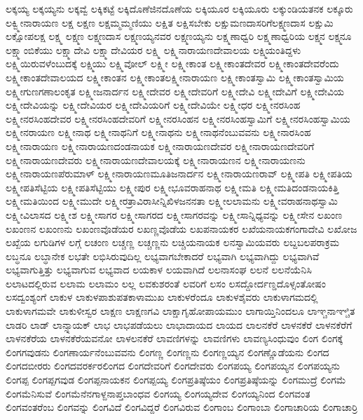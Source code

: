 {ಲಕ್ಕಯ್ಯ
ಲಕ್ಕಯ್ಯನು
ಲಕ್ಕವ್ವೆ
ಲಕ್ಕಿಕಟ್ಟೆ
ಲಕ್ಕಿದೊಣೆಜಿನದೊಣೆಯ
ಲಕ್ಕಿಯೂರ
ಲಕ್ಕಿಯೂರು
ಲಕ್ಕುಂಡಿಯತನಕ
ಲಕ್ಕೂರು
ಲಕ್ವ್ಮೀನಾರಾಯಣ
ಲಕ್ಷ
ಲಕ್ಷಣ
ಲಕ್ಷಮ್ಮಮ್ಮಣಿಯು
ಲಕ್ಷಿತ
ಲಕ್ಷಿಸಬೇಕು
ಲಕ್ಷುಮಣದಾಸರಿಗೆಲಕ್ಷ್ಮಣದಾಸ
ಲಕ್ಷುಮಿ
ಲಕ್ಷೋಪಲಕ್ಷ
ಲಕ್ಷ್ಮ
ಲಕ್ಷ್ಮಣ
ಲಕ್ಷ್ಮಣದಾಸ
ಲಕ್ಷ್ಮಣಯ್ಯನವರ
ಲಕ್ಷ್ಮಣಯ್ಯನು
ಲಕ್ಷ್ಮಣಾಧ್ವರಿ
ಲಕ್ಷ್ಮಣಾಧ್ವರಿಯ
ಲಕ್ಷ್ಮನ
ಲಕ್ಷ್ಮನೂ
ಲಕ್ಷ್ಮಾಂಬಿಕೆಯು
ಲಕ್ಷ್ಮಾದೇವಿ
ಲಕ್ಷ್ಮಾದೇವಿಯರ
ಲಕ್ಷ್ಮಿ
ಲಕ್ಷ್ಮಿನಾರಾಯಣದೇವಾಲಯ
ಲಕ್ಷ್ಮಿಯಂತಿದ್ದಳು
ಲಕ್ಷ್ಮಿಯಿರುವಳೆಂಬುದಕ್ಕೆ
ಲಕ್ಷ್ಮಿಯು
ಲಕ್ಷ್ಮಿವೋಲ್
ಲಕ್ಷ್ಮೀ
ಲಕ್ಷ್ಮೀಕಾಂತ
ಲಕ್ಷ್ಮೀಕಾಂತದೇವರ
ಲಕ್ಷ್ಮೀಕಾಂತದೇವರೆಂದು
ಲಕ್ಷ್ಮೀಕಾಂತದೇವಾಲಯದ
ಲಕ್ಷ್ಮೀಕಾಂತನ
ಲಕ್ಷ್ಮೀಕಾಂತಲಕ್ಷ್ಮೀನಾರಾಯಣ
ಲಕ್ಷ್ಮೀಕಾಂತಸ್ವಾಮಿ
ಲಕ್ಷ್ಮೀಕಾಂತಸ್ವಾಮಿಯ
ಲಕ್ಷ್ಮೀಗುಣಗಣಾಲಂಕೃತ
ಲಕ್ಷ್ಮೀಜನಾರ್ದನ
ಲಕ್ಷ್ಮೀದೇವರ
ಲಕ್ಷ್ಮೀದೇವರಿಗೆ
ಲಕ್ಷ್ಮೀದೇವಿ
ಲಕ್ಷ್ಮೀದೇವಿಗೆ
ಲಕ್ಷ್ಮೀದೇವಿಯ
ಲಕ್ಷ್ಮೀದೇವಿಯನ್ನು
ಲಕ್ಷ್ಮೀದೇವಿಯರ
ಲಕ್ಷ್ಮೀದೇವಿಯರಿಗೆ
ಲಕ್ಷ್ಮೀದೇವಿಯೇ
ಲಕ್ಷ್ಮೀಧರ
ಲಕ್ಷ್ಮೀನರಸಿಂಹ
ಲಕ್ಷ್ಮೀನರಸಿಂಹದೇವರ
ಲಕ್ಷ್ಮೀನರಸಿಂಹದೇವರಿಗೆ
ಲಕ್ಷ್ಮೀನರಸಿಂಹನ
ಲಕ್ಷ್ಮೀನರಸಿಂಹಸ್ವಾಮಿಗೆ
ಲಕ್ಷ್ಮೀನರಸಿಂಹಸ್ವಾಮಿಯ
ಲಕ್ಷ್ಮೀನರಾಯಣ
ಲಕ್ಷ್ಮೀನಾಥ
ಲಕ್ಷ್ಮೀನಾಥನಿಗೆ
ಲಕ್ಷ್ಮೀನಾಥನು
ಲಕ್ಷ್ಮೀನಾಥನೆಂಬುವವನು
ಲಕ್ಷ್ಮೀನಾರಸಿಂಹ
ಲಕ್ಷ್ಮೀನಾರಾಯಣ
ಲಕ್ಷ್ಮೀನಾರಾಯಣದಂಡನಾಯಕ
ಲಕ್ಷ್ಮೀನಾರಾಯಣದೇವರ
ಲಕ್ಷ್ಮೀನಾರಾಯಣದೇವರಿಗೆ
ಲಕ್ಷ್ಮೀನಾರಾಯಣದೇವರು
ಲಕ್ಷ್ಮೀನಾರಾಯಣದೇವಾಲಯಕ್ಕೆ
ಲಕ್ಷ್ಮೀನಾರಾಯಣನ
ಲಕ್ಷ್ಮೀನಾರಾಯಣನು
ಲಕ್ಷ್ಮೀನಾರಾಯಣಪೆರುಮಾಳ್
ಲಕ್ಷ್ಮೀನಾರಾಯಣಮೂತಿಜನಾರ್ದನ
ಲಕ್ಷ್ಮೀನಾರಾಯಣರಾವ್
ಲಕ್ಷ್ಮೀಪತಿ
ಲಕ್ಷ್ಮೀಪತಿಯ
ಲಕ್ಷ್ಮೀಪತಿಸೆಟ್ಟಿಯ
ಲಕ್ಷ್ಮೀಪತಿಸೆಟ್ಟಿಯು
ಲಕ್ಷ್ಮೀಪುರ
ಲಕ್ಷ್ಮೀಭೂವರಾಹನಾಥ
ಲಕ್ಷ್ಮೀಮತಿ
ಲಕ್ಷ್ಮೀಮತಿದಂಡನಾಯಕಿತ್ತಿ
ಲಕ್ಷ್ಮೀಮತಿಯಿಂದ
ಲಕ್ಷ್ಮೀಮುದೇ
ಲಕ್ಷ್ಮೀರತ್ರಾವಿರಾಸೀನ್ನಿಖಿಳಜನನತಾ
ಲಕ್ಷ್ಮೀಲಲಾಮನು
ಲಕ್ಷ್ಮೀವರಾಹನಾಥಸ್ವಾಮಿ
ಲಕ್ಷ್ಮೀವಿಲಾಸದ
ಲಕ್ಷ್ಮೀಶ
ಲಕ್ಷ್ಮೀಸಾಗರ
ಲಕ್ಷ್ಮೀಸಾಗರದ
ಲಕ್ಷ್ಮೀಸಾಗರವನ್ನು
ಲಕ್ಷ್ಮೀಸಾನ್ನಿಧ್ಯವನ್ನು
ಲಕ್ಷ್ಮೀಸೇನ
ಲಖಂಣ
ಲಖಂಣನ
ಲಖಂಣನು
ಲಖಂಣವೊಡೆಯರ
ಲಖಣ್ಣವೊಡೆಯ
ಲಖಪನಾಯಕರ
ಲಖೆಯನಾಯಕಗಂಗಾದೇವಿ
ಲಖೋಜ
ಲಖ್ಖೆಯ
ಲಗುಡಿಗಳ
ಲಗ್ಗೆ
ಲಚಂಣ
ಲಚ್ಚಣ್ಣ
ಲಚ್ಚಣ್ಣನು
ಲಚ್ಚಿಯನಾಯಕ
ಲನಸ್ವಾಮಿಯವರು
ಲಬ್ದಬಲಪರಾಕ್ರಮ
ಲಬ್ಧನೂ
ಲಬ್ಧಾನೇಕ
ಲಭತೇ
ಲಭಿಸಿರುವುದಿಲ್ಲ
ಲಭ್ಯವಾಗಬೇಕಾದರೆ
ಲಭ್ಯವಾಗಿ
ಲಭ್ಯವಾಗಿದ್ದು
ಲಭ್ಯವಾಗಿವೆ
ಲಭ್ಯವಾಗುತ್ತಿತ್ತು
ಲಭ್ಯವಾಗುವ
ಲಭ್ಯವಾದ
ಲಯಕಾಳ
ಲಯವಾಗಿದೆ
ಲಲನಾಸಂಘ
ಲಲನೆ
ಲಲನೆಯೆನಿಸಿ
ಲಲಾಟದಲ್ಲಿರುವ
ಲಲಾಮ
ಲಲಾಮಂ
ಲಲ್ಲ
ಲವಕುಶರಂತೆ
ಲವರಿಗೆ
ಲಸಂ
ಲಸದ್ದೋರ್ದಣ್ಡದೊಳ್ಸಂತೋಷಂ
ಲಸದ್ವಂಶ್ಯಂಗೆ
ಲಾಕುಳ
ಲಾಕುಳಪಾಶುಪತಕಾಳಾಮುಖ
ಲಾಕುಳರೆಂದೂ
ಲಾಕುಳಶೈವರು
ಲಾಕುಳಾಗಮದಲ್ಲಿ
ಲಾಕುಳಾಗಮವೇ
ಲಾಕುಳೀಸ್ವರ
ಲಾಕ್ಷಣ
ಲಾಕ್ಷಣಗವಿ
ಲಾಕ್ಷಾಗೃಹೋಪಾಯಮುಂ
ಲಾಗಾಯ್ತಿನಿಂದಲೂ
ಲಾಞ್ಚನಾಞ್ಚಿತ
ಲಾಡರಿ
ಲಾಡ್
ಲಾನ್ಸ್ನಾಯಕ್
ಲಾಭ
ಲಾಭಪಡೆಯಲು
ಲಾಭಾದಾಯದ
ಲಾಯದ
ಲಾಲನಕೆರೆ
ಲಾಳನಕೆರೆ
ಲಾಳನಕೆರೆಗೆ
ಲಾಳನಕೆರೆಯ
ಲಾಳನಕೆರೆಯವನೋ
ಲಾಳಲನಕೆರೆ
ಲಾವಣಿಗಳನ್ನು
ಲಾವಣಿಗಳು
ಲಾವಣ್ಯಸಿಂಧುವುಂ
ಲಿಂಗ
ಲಿಂಗಕ್ಕೆ
ಲಿಂಗಗವುಡನು
ಲಿಂಗಣಾರ್ಯನೆಂಬುವವನು
ಲಿಂಗಣ್ಣ
ಲಿಂಗಣ್ಣನು
ಲಿಂಗಣ್ಣಯ್ಯನ
ಲಿಂಗಣ್ಣೊಡೆಯನು
ಲಿಂಗದ
ಲಿಂಗದಬೀರರು
ಲಿಂಗದವರರ್ಕರಲಿಂಗದ
ಲಿಂಗದೇವರಿಗೆ
ಲಿಂಗದೇವರು
ಲಿಂಗಪಯ್ಯ
ಲಿಂಗಪಯ್ಯನ
ಲಿಂಗಪಯ್ಯನು
ಲಿಂಗಪ್ಪ
ಲಿಂಗಪ್ಪಗವುಡ
ಲಿಂಗಪ್ಪನಾಯಕನ
ಲಿಂಗಪ್ಪಯ್ಯ
ಲಿಂಗಪ್ರತಿಷ್ಠೆಯಂ
ಲಿಂಗಪ್ರತಿಷ್ಠೆಯನ್ನು
ಲಿಂಗಮುದ್ರೆ
ಲಿಂಗಮೆ
ಲಿಂಗಮೆನಿಸುವೆ
ಲಿಂಗಮೆನೆನಗಾಳ್ದನಾಪ್ತಬಾಂಧವ
ಲಿಂಗಯ್ಯ
ಲಿಂಗಯ್ಯದೇವ
ಲಿಂಗಯ್ಯನಿಂದ
ಲಿಂಗವಂತ
ಲಿಂಗವಂತರೆಂಬ
ಲಿಂಗವನ್ನು
ಲಿಂಗವಿದೆ
ಲಿಂಗವಿದ್ದರೆ
ಲಿಂಗವಿರುವ
ಲಿಂಗಾಂಬ
ಲಿಂಗಾಂಬಾ
ಲಿಂಗಾಚಾರಿಯ
ಲಿಂಗಾಚಾರ್ರಿ
}
